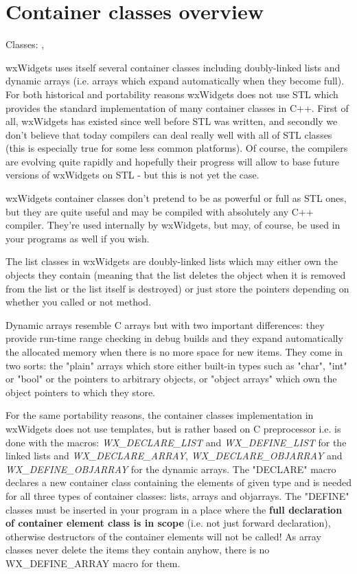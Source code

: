 \section{Container classes overview}\label{wxcontaineroverview}

Classes: , 

wxWidgets uses itself several container classes including doubly-linked lists
and dynamic arrays (i.e. arrays which expand automatically when they become
full). For both historical and portability reasons wxWidgets does not
use STL which provides the standard implementation of many container classes in
C++. First of all, wxWidgets has existed since well before STL was written, and
secondly we don't believe that today compilers can deal really well with all of
STL classes (this is especially true for some less common platforms). Of
course, the compilers are evolving quite rapidly and hopefully their progress
will allow to base future versions of wxWidgets on STL - but this is not yet
the case.

wxWidgets container classes don't pretend to be as powerful or full as STL
ones, but they are quite useful and may be compiled with absolutely any C++
compiler. They're used internally by wxWidgets, but may, of course, be used in
your programs as well if you wish.

The list classes in wxWidgets are doubly-linked lists which may either own the
objects they contain (meaning that the list deletes the object when it is
removed from the list or the list itself is destroyed) or just store the
pointers depending on whether you called or not 
 method.

Dynamic arrays resemble C arrays but with two important differences: they
provide run-time range checking in debug builds and they expand automatically
the allocated memory when there is no more space for new items. They come in
two sorts: the "plain" arrays which store either built-in types such as "char",
"int" or "bool" or the pointers to arbitrary objects, or "object arrays" which
own the object pointers to which they store.

For the same portability reasons, the container classes implementation in wxWidgets
does not use templates, but is rather based on C preprocessor i.e. is done with
the macros: {\it WX\_DECLARE\_LIST} and {\it WX\_DEFINE\_LIST} for the linked
lists and {\it WX\_DECLARE\_ARRAY}, {\it WX\_DECLARE\_OBJARRAY} and {\it WX\_DEFINE\_OBJARRAY} for
the dynamic arrays. The "DECLARE" macro declares a
new container class containing the elements of given type and is needed for all
three types of container classes: lists, arrays and objarrays. The "DEFINE"
classes must be inserted in your program in a place where the {\bf full
declaration of container element class is in scope} (i.e. not just forward
declaration), otherwise destructors of the container elements will not be
called! As array classes never delete the items they contain anyhow, there is
no WX\_DEFINE\_ARRAY macro for them.

